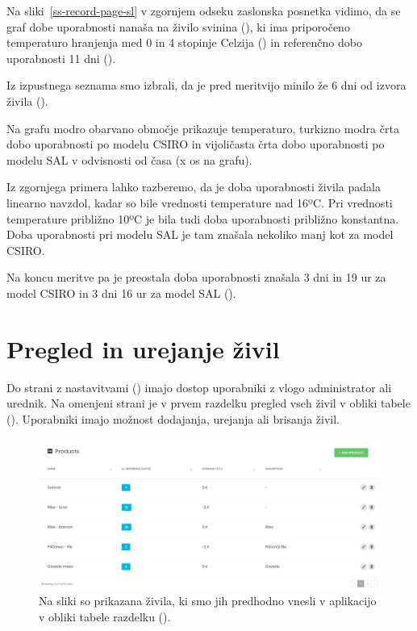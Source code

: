 \documentclass[a4paper, 12pt]{book}
\begin{document}
Na sliki~\ref{ss-record-page-sl} v zgornjem odseku zaslonska posnetka vidimo, da se graf dobe uporabnosti nanaša na živilo svinina (), ki ima priporočeno temperaturo hranjenja med 0 in 4 stopinje Celzija () in referenčno dobo uporabnosti 11 dni ().

Iz izpustnega seznama smo izbrali, da je pred meritvijo minilo že 6 dni od izvora živila ().

Na grafu modro obarvano območje prikazuje temperaturo, turkizno modra črta dobo uporabnosti po modelu CSIRO in vijoličasta črta dobo uporabnosti po modelu SAL v odvisnosti od časa (x os na grafu).

Iz zgornjega primera lahko razberemo, da je doba uporabnosti živila padala linearno navzdol, kadar so bile vrednosti temperature nad 16ºC. Pri vrednosti temperature približno 10ºC je bila tudi doba uporabnosti približno konstantna. Doba uporabnosti pri modelu SAL je tam znašala nekoliko manj kot za model CSIRO.

Na koncu meritve pa je preostala doba uporabnosti znašala 3 dni in 19 ur za model CSIRO in 3 dni 16 ur za model SAL ().



\section{Pregled in urejanje živil}

Do strani z nastavitvami () imajo dostop uporabniki z vlogo administrator ali urednik. Na omenjeni strani je v prvem razdelku pregled vseh živil v obliki tabele (). Uporabniki imajo možnost dodajanja, urejanja ali brisanja živil.

\begin{figure}[h]
\begin{center}
\includegraphics[width=\textwidth]{slike/products.png}
\end{center}
\caption{Na sliki so prikazana živila, ki smo jih predhodno vnesli v aplikacijo v obliki tabele razdelku ().}
\label{ss-settings-products}
\end{figure}
\end{document}
